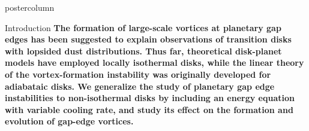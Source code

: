 \documentclass[final,hyperref={pdfpagelabels=false}]{beamer}
\newlength{\columnheight}
\begin{document}
\begin{frame}
\begin{columns}

    \begin{column}{.49\textwidth}
      \begin{beamercolorbox}[center,wd=\textwidth]{postercolumn}
        \begin{minipage}[T]{.95\textwidth}  %
          \parbox[t][\columnheight]{\textwidth}{ %
            \begin{block}{{\Large Introduction}}
              \justifying
                  {\large              
                    {\bf
                      The formation of large-scale vortices at planetary gap edges has been
                      suggested to explain observations of transition
                      disks with lopsided dust
                      distributions. Thus far, theoretical disk-planet
                      models have employed locally isothermal disks, while 
                      the linear theory of the vortex-formation 
                      instability was originally developed for adiabataic disks. We
                      generalize the study of planetary gap edge
                      instabilities to non-isothermal disks by
                      including an energy equation with variable
                      cooling rate, and study its effect on the
                      formation and evolution of gap-edge vortices. 
                    }
                  }
            \end{block}
            \vfill
             
}
\end{minipage}
\end{beamercolorbox}
\end{column}
\end{columns}
\end{frame}
\end{document}
